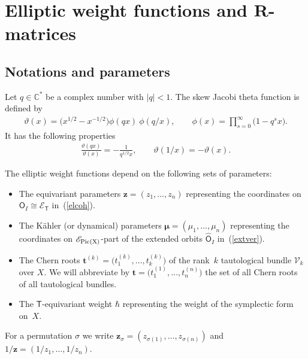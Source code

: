 \documentclass[pdftex]{sigma}
\def\C{{\mathbb C}}
\newcommand{\bT}{\mathsf{T}}
\newcommand{\Or}{\textsf{O}}
\newcommand{\cE}{\mathscr{E}}
\def\ttt{{\boldsymbol t}}
\def\zz{{\boldsymbol z}}
\def\mub{{\boldsymbol\mu}}
\newcommand{\cV}{\mathcal{V}}
\let\thi\vartheta
\let\pho\phi
\numberwithin{equation}{section}
\begin{document}
\section[Elliptic weight functions and $R$-matrices]{Elliptic weight functions and $\boldsymbol{R}$-matrices}\label{sec:2}

\subsection{Notations and parameters} \label{notesec}
Let $q\in \C^*$ be a complex number with $|q|<1$. The skew Jacobi theta function is defined by
\begin{gather*}%
\thi(x)=\big(x^{1/2}-x^{-1/2}\big)\pho(qx)\>\pho(q/x),\qquad \pho(x)=\prod_{s=0}^\infty\big(1-q^s x\big).
\end{gather*}
It has the following properties
\begin{gather*}%
\frac{\thi(qx)}{\thi(x)}=-\frac1{q^{1/2}x},\qquad\thi(1/x)=-\thi(x).
\end{gather*}

The elliptic weight functions depend on the following sets of parameters:
\begin{itemize}\itemsep=0pt
\item The equivariant parameters $\zz=(z_{1},\dots, z_{n})$ representing the coordinates on $\Or_I\cong \cE_{\bT}$ in~(\ref{elcoh}).
\item The K\"ahler (or dynamical) parameters $\mub=(\mu_{1},\dots, \mu_{n})$ representing the coordinates on $\cE_{\rm{Pic}(X)}$-part of the extended orbits $\widehat{\Or}_{I}$ in~(\ref{extver}).

\item The Chern roots $\ttt^{(k)} = \big(t^{(k)}_{1},\dots, t^{(k)}_{k}\big)$ of the rank~$k$ tautological bundle $\cV_k$ over $X$. We will abbreviate by $\ttt=\big(t^{(1)}_{1},\dots,t^{(n)}_{n}\big)$ the set of all Chern roots of all tautological bundles.

\item The $\bT$-equivariant weight $\hbar$ representing the weight of the symplectic form on~$X$.
\end{itemize}

For a permutation $\sigma$ we write $\zz_{\sigma}=(z_{\sigma(1)},\dots,z_{\sigma(n)})$ and $1/\zz=(1/z_1,\dots,1/z_n)$.
\end{document}
